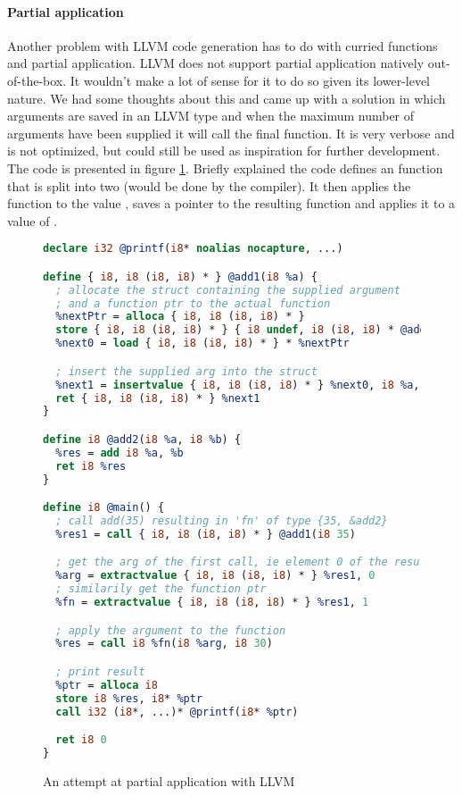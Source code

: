 \paragraph{Partial application}
Another problem with LLVM code generation has to do with curried functions and partial application. LLVM does not support partial application natively out-of-the-box. It wouldn't make a lot of sense for it to do so given its lower-level nature. We had some thoughts about this and came up with a solution in which arguments are saved in an LLVM  type and when the maximum number of arguments have been supplied it will call the final function. It is very verbose and is not optimized, but could still be used as inspiration for further development. The code is presented in figure \ref{fig:llvm-partial}. Briefly explained the code defines an  function that is split into two (would be done by the compiler). It then applies the function to the value , saves a pointer to the resulting function and applies it to a value of .

\begin{figure}[p]
\begin{lstlisting}[language=llvm]
declare i32 @printf(i8* noalias nocapture, ...)

define { i8, i8 (i8, i8) * } @add1(i8 %a) {
  ; allocate the struct containing the supplied argument
  ; and a function ptr to the actual function
  %nextPtr = alloca { i8, i8 (i8, i8) * }
  store { i8, i8 (i8, i8) * } { i8 undef, i8 (i8, i8) * @add2 }, { i8, i8 (i8, i8) * } * %nextPtr
  %next0 = load { i8, i8 (i8, i8) * } * %nextPtr

  ; insert the supplied arg into the struct
  %next1 = insertvalue { i8, i8 (i8, i8) * } %next0, i8 %a, 0
  ret { i8, i8 (i8, i8) * } %next1
}

define i8 @add2(i8 %a, i8 %b) {
  %res = add i8 %a, %b
  ret i8 %res
}

define i8 @main() {
  ; call add(35) resulting in 'fn' of type {35, &add2}
  %res1 = call { i8, i8 (i8, i8) * } @add1(i8 35)

  ; get the arg of the first call, ie element 0 of the resulting struct
  %arg = extractvalue { i8, i8 (i8, i8) * } %res1, 0
  ; similarily get the function ptr
  %fn = extractvalue { i8, i8 (i8, i8) * } %res1, 1

  ; apply the argument to the function
  %res = call i8 %fn(i8 %arg, i8 30)

  ; print result
  %ptr = alloca i8
  store i8 %res, i8* %ptr
  call i32 (i8*, ...)* @printf(i8* %ptr)

  ret i8 0
}
\end{lstlisting}
\caption{An attempt at partial application with LLVM}
\label{fig:llvm-partial}
\end{figure}


